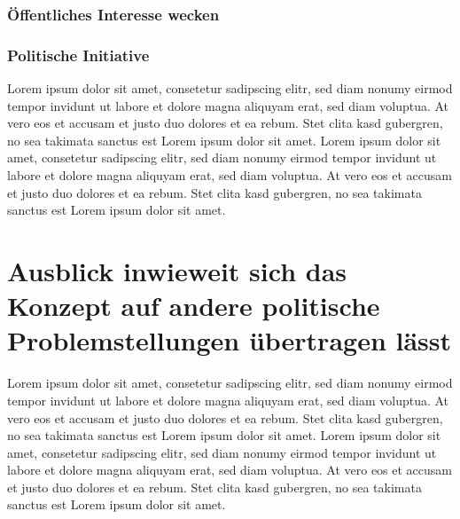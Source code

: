\documentclass[a4paper, 10pt]{scrartcl}
\begin{document}
\subsubsection{Öffentliches Interesse wecken}
\subsubsection{Politische Initiative}

Lorem ipsum dolor sit amet, consetetur sadipscing elitr, sed diam nonumy eirmod tempor invidunt ut labore et dolore magna aliquyam erat, sed diam voluptua. At vero eos et accusam et justo duo dolores et ea rebum. Stet clita kasd gubergren, no sea takimata sanctus est Lorem ipsum dolor sit amet. Lorem ipsum dolor sit amet, consetetur sadipscing elitr, sed diam nonumy eirmod tempor invidunt ut labore et dolore magna aliquyam erat, sed diam voluptua. At vero eos et accusam et justo duo dolores et ea rebum. Stet clita kasd gubergren, no sea takimata sanctus est Lorem ipsum dolor sit amet.
\section{Ausblick inwieweit sich das Konzept auf andere politische Problemstellungen übertragen lässt}
Lorem ipsum dolor sit amet, consetetur sadipscing elitr, sed diam nonumy eirmod tempor invidunt ut labore et dolore magna aliquyam erat, sed diam voluptua. At vero eos et accusam et justo duo dolores et ea rebum. Stet clita kasd gubergren, no sea takimata sanctus est Lorem ipsum dolor sit amet. Lorem ipsum dolor sit amet, consetetur sadipscing elitr, sed diam nonumy eirmod tempor invidunt ut labore et dolore magna aliquyam erat, sed diam voluptua. At vero eos et accusam et justo duo dolores et ea rebum. Stet clita kasd gubergren, no sea takimata sanctus est Lorem ipsum dolor sit amet.


\cite{bitzer1999digitale}
\cite{clark2016financial}
\cite{panko2014business}
\cite{antonopoulos2014mastering}
\cite{DannenChris2017IEaS}
\cite{GrosjeanGodefroy2017RtEU}
\cite{tietenberg2006emissions}
\cite{gerhard2000theorie}
\cite{Dutschke1998Issues}


\nocite{bitzer1999digitale}
\nocite{clark2016financial}
\nocite{panko2014business}
\nocite{antonopoulos2014mastering}
\nocite{DannenChris2017IEaS}
\nocite{GrosjeanGodefroy2017RtEU}
\nocite{tietenberg2006emissions}
\nocite{gerhard2000theorie}
\nocite{Dutschke1998Issues}

\newpage
\listoffigures %

\newpage
\end{document}
